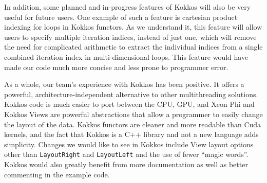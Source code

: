 In addition, some planned and in-progress features of Kokkos will also be very
useful for future users. One example of such a feature is cartesian product
indexing for loops in Kokkos functors.  As we understand it, this feature will
allow users to specify multiple iteration indices, instead of just one, which
will remove the need for complicated arithmetic to extract the individual
indices from a single combined iteration index in multi-dimensional loops.  This
feature would have made our code much more concise and less prone to programmer
error.

As a whole, our team's experience with Kokkos has been positive.  It offers a
powerful, architecture-independent alternative to other multithreading
solutions.  Kokkos code is much easier to port between the CPU, GPU, and Xeon
Phi and Kokkos Views are powerful abstractions that allow a programmer to easily
change the layout of the data.  Kokkos functors are cleaner and more readable
than Cuda kernels, and the fact that Kokkos is a C++ library and not a new
language adds simplicity.  Changes we would like to see in Kokkos include View
layout options other than \texttt{LayoutRight} and \texttt{LayoutLeft} and the use of fewer
``magic words''.  Kokkos would also greatly benefit from more documentation as
well as better commenting in the example code.
